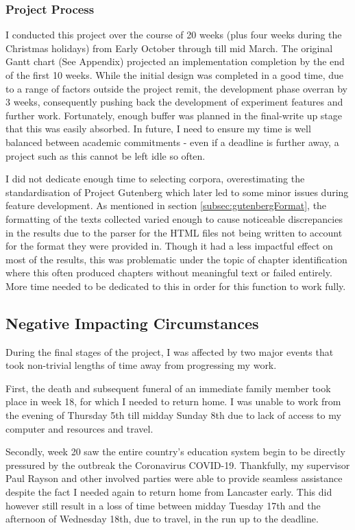 \documentclass{article}
\begin{document}
        \subsubsection{Project Process}
            I conducted this project over the course of 20 weeks (plus four weeks during the Christmas holidays) from Early October through till mid March. The original Gantt chart (See Appendix) projected an implementation completion by the end of the first 10 weeks. While the initial design was completed in a good time, due to a range of factors outside the project remit, the development phase overran by 3 weeks, consequently pushing back the development of experiment features and further work. Fortunately, enough buffer was planned in the final-write up stage that this was easily absorbed. In future, I need to ensure my time is well balanced between academic commitments - even if a deadline is further away, a project such as this cannot be left idle so often.

            I did not dedicate enough time to selecting corpora, overestimating the standardisation of Project Gutenberg which later led to some minor issues during feature development. As mentioned in section \ref{subsec:gutenbergFormat}, the formatting of the texts collected varied enough to cause noticeable discrepancies in the results due to the parser for the HTML files not being written to account for the format they were provided in. Though it had a less impactful effect on most of the results, this was problematic under the topic of chapter identification where this often produced chapters without meaningful text or failed entirely. More time needed to be dedicated to this in order for this function to work fully.
    \subsection{Negative Impacting Circumstances}
        During the final stages of the project, I was affected by two major events that took non-trivial lengths of time away from progressing my work.

        First, the death and subsequent funeral of an immediate family member took place in week 18, for which I needed to return home. I was unable to work from the evening of Thursday 5th till midday Sunday 8th due to lack of access to my computer and resources and travel.

        Secondly, week 20 saw the entire country's education system begin to be directly pressured by the outbreak the Coronavirus COVID-19. Thankfully, my supervisor Paul Rayson and other involved parties were able to provide seamless assistance despite the fact I needed again to return home from Lancaster early. This did however still result in a loss of time between midday Tuesday 17th and the afternoon of Wednesday 18th, due to travel, in the run up to the deadline.
\end{document}
